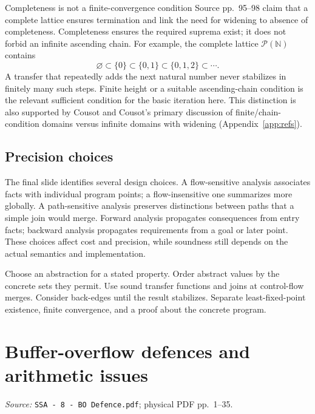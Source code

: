 \documentclass[11pt,a4paper]{article}
\newcommand{\currentmodule}{Contents}
\newcommand{\source}[2]{\textcolor{muted}{\small\textit{Source:} \nolinkurl{#1}; physical PDF pp.~#2.}\par\medskip}
\newcommand{\module}[2]{\par\Needspace{8\baselineskip}\gdef\currentmodule{#1}\section{#1}\label{#2}}
\newcommand{\powerset}{\mathcal{P}}
\numberwithin{figure}{section}
\begin{document}
\begin{correction}{Completeness is not a finite-convergence condition}
Source pp.~95--98 claim that a complete lattice ensures termination and link the need for widening to absence of completeness. Completeness ensures the required suprema exist; it does not forbid an infinite ascending chain. For example, the complete lattice $\powerset(\mathbb N)$ contains
\[
\varnothing\subset\{0\}\subset\{0,1\}\subset\{0,1,2\}\subset\cdots.
\]
A transfer that repeatedly adds the next natural number never stabilizes in finitely many such steps. Finite height or a suitable ascending-chain condition is the relevant sufficient condition for the basic iteration here. This distinction is also supported by Cousot and Cousot's primary discussion of finite/chain-condition domains versus infinite domains with widening (Appendix~\ref{app:refs}).
\end{correction}

\subsection{Precision choices}
The final slide identifies several design choices. A flow-sensitive analysis associates facts with individual program points; a flow-insensitive one summarizes more globally. A path-sensitive analysis preserves distinctions between paths that a simple join would merge. Forward analysis propagates consequences from entry facts; backward analysis propagates requirements from a goal or later point. These choices affect cost and precision, while soundness still depends on the actual semantics and implementation.

\begin{takeaway}
Choose an abstraction for a stated property. Order abstract values by the concrete sets they permit. Use sound transfer functions and joins at control-flow merges. Consider back-edges until the result stabilizes. Separate least-fixed-point existence, finite convergence, and a proof about the concrete program.
\end{takeaway}

\module{Buffer-overflow defences and arithmetic issues}{sec:defences}
\source{SSA - 8 - BO Defence.pdf}{1--35}
\end{document}
